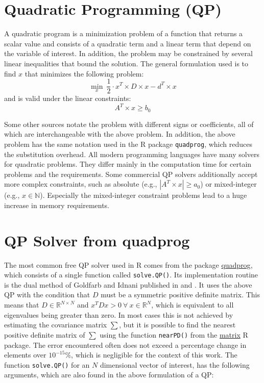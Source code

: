 \documentclass[
  oneside]{book}
\begin{document}
\hypertarget{quadratic-programming-qp}{%
\section{Quadratic Programming (QP)}\label{quadratic-programming-qp}}

A quadratic program is a minimization problem of a function that returns a scalar value and consists of a quadratic term and a linear term that depend on the variable of interest. In addition, the problem may be constrained by several linear inequalities that bound the solution. The general formulation used is to find \(x\) that minimizes the following problem:
\[
  \min\limits_{x} \ \frac{1}{2} \cdot x^T \times D \times x - d^T \times x 
\]
and is valid under the linear constraints:
\[
  A^T \times x \geq b_0
\]

Some other sources notate the problem with different signs or coefficients, all of which are interchangeable with the above problem. In addition, the above problem has the same notation used in the R package \texttt{quadprog}, which reduces the substitution overhead. All modern programming languages have many solvers for quadratic problems. They differ mainly in the computation time for certain problems and the requirements. Some commercial QP solvers additionally accept more complex constraints, such as absolute (e.g., \(|A^T \times x| \geq a_0\)) or mixed-integer (e.g., \(x \in \mathbb{N}\)). Especially the mixed-integer constraint problems lead to a huge increase in memory requirements.

\hypertarget{qp-solver-from-quadprog}{%
\section{QP Solver from quadprog}\label{qp-solver-from-quadprog}}

The most common free QP solver used in R comes from the package \href{https://cran.r-project.org/web/packages/quadprog/quadprog.pdf}{quadprog}, which consists of a single function called \texttt{solve.QP()}. Its implementation routine is the dual method of Goldfarb and Idnani published in \citep{GoId1982} and \citep{GoId1983}. It uses the above QP with the condition that \(D\) must be a symmetric positive definite matrix. This means that \(D\in \mathbb{R}^{N \times N}\) and \(x^T D x > 0 \ \forall \ x \in \mathbb{R}^N\), which is equivalent to all eigenvalues being greater than zero. In most cases this is not achieved by estimating the covariance matrix \(\sum\), but it is possible to find the nearest positive definite matrix of \(\textstyle\sum\) using the function \texttt{nearPD()} from the \href{https://cran.r-project.org/web/packages/Matrix/Matrix.pdf}{matrix} R package. The error encountered often does not exceed a percentage change in elements over \(10^{-15} \%\), which is negligible for the context of this work. The function \texttt{solve.QP()} for an \(N\) dimensional vector of interest, has the following arguments, which are also found in the above formulation of a QP:
\end{document}
